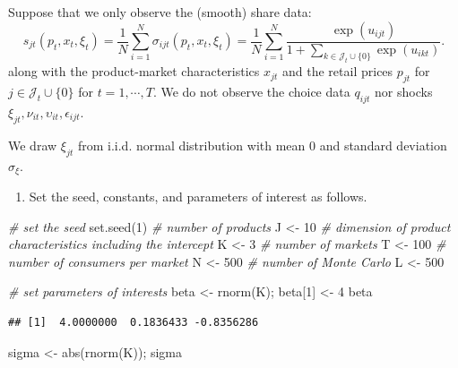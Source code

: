 \documentclass[
]{book}
\newenvironment{Shaded}{\begin{snugshade}}{\end{snugshade}}
\newcommand{\CommentTok}[1]{\textcolor[rgb]{0.56,0.35,0.01}{\textit{#1}}}
\newcommand{\DecValTok}[1]{\textcolor[rgb]{0.00,0.00,0.81}{#1}}
\newcommand{\FunctionTok}[1]{\textcolor[rgb]{0.00,0.00,0.00}{#1}}
\newcommand{\NormalTok}[1]{#1}
\newcommand{\OtherTok}[1]{\textcolor[rgb]{0.56,0.35,0.01}{#1}}
\providecommand{\tightlist}{%
  \setlength{\itemsep}{0pt}\setlength{\parskip}{0pt}}
\begin{document}
Suppose that we only observe the (smooth) share data:
\[
s_{jt}(p_t, x_t, \xi_t) = \frac{1}{N} \sum_{i = 1}^N \sigma_{ijt}(p_t, x_t, \xi_t) = \frac{1}{N} \sum_{i = 1}^N \frac{\exp(u_{ijt})}{1 + \sum_{k \in \mathcal{J}_t \cup \{0\}} \exp(u_{ikt})}. 
\]
along with the product-market characteristics \(x_{jt}\) and the retail prices \(p_{jt}\) for \(j \in \mathcal{J}_t \cup \{0\}\) for \(t = 1, \cdots, T\). We do not observe the choice data \(q_{ijt}\) nor shocks \(\xi_{jt}, \nu_{it}, \upsilon_{it}, \epsilon_{ijt}\).

We draw \(\xi_{jt}\) from i.i.d. normal distribution with mean 0 and standard deviation \(\sigma_{\xi}\).

\begin{enumerate}
\def\labelenumi{\arabic{enumi}.}
\tightlist
\item
  Set the seed, constants, and parameters of interest as follows.
\end{enumerate}

\begin{Shaded}
\begin{Highlighting}[]
\CommentTok{\# set the seed}
\FunctionTok{set.seed}\NormalTok{(}\DecValTok{1}\NormalTok{)}
\CommentTok{\# number of products}
\NormalTok{J }\OtherTok{\textless{}{-}} \DecValTok{10}
\CommentTok{\# dimension of product characteristics including the intercept}
\NormalTok{K }\OtherTok{\textless{}{-}} \DecValTok{3}
\CommentTok{\# number of markets}
\NormalTok{T }\OtherTok{\textless{}{-}} \DecValTok{100}
\CommentTok{\# number of consumers per market}
\NormalTok{N }\OtherTok{\textless{}{-}} \DecValTok{500}
\CommentTok{\# number of Monte Carlo}
\NormalTok{L }\OtherTok{\textless{}{-}} \DecValTok{500}
\end{Highlighting}
\end{Shaded}

\begin{Shaded}
\begin{Highlighting}[]
\CommentTok{\# set parameters of interests}
\NormalTok{beta }\OtherTok{\textless{}{-}} \FunctionTok{rnorm}\NormalTok{(K); }
\NormalTok{beta[}\DecValTok{1}\NormalTok{] }\OtherTok{\textless{}{-}} \DecValTok{4}
\NormalTok{beta}
\end{Highlighting}
\end{Shaded}

\begin{verbatim}
## [1]  4.0000000  0.1836433 -0.8356286
\end{verbatim}

\begin{Shaded}
\begin{Highlighting}[]
\NormalTok{sigma }\OtherTok{\textless{}{-}} \FunctionTok{abs}\NormalTok{(}\FunctionTok{rnorm}\NormalTok{(K)); sigma}
\end{Highlighting}
\end{Shaded}
\end{document}
